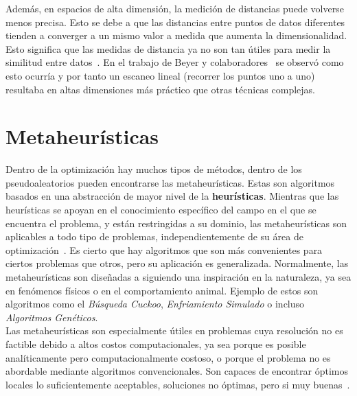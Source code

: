 Además, en espacios de alta dimensión, la medición de distancias puede volverse menos precisa. Esto se debe a que las distancias entre puntos de datos diferentes tienden a converger a un mismo valor a medida que aumenta la dimensionalidad. Esto significa que las medidas de distancia ya no son tan útiles para medir la similitud entre datos~\cite{peng_interpreting_2024, venkat2018curse}. En el trabajo de Beyer y colaboradores~\cite{beyer99nn} se observó como esto ocurría y por tanto un escaneo lineal (recorrer los puntos uno a uno) resultaba en altas dimensiones más práctico que otras técnicas complejas.
\section{Metaheurísticas}
Dentro de la optimización hay muchos tipos de métodos, dentro de los pseudoaleatorios pueden encontrarse las metaheurísticas. Estas son algoritmos basados en una abstracción de mayor nivel de la \textbf{heurísticas}. Mientras que las heurísticas se apoyan en el conocimiento específico del campo en el que se encuentra el problema, y están restringidas a su dominio, las metaheurísticas son aplicables a todo tipo de problemas, independientemente de su área de optimización~\cite{bianchi2009survey}. Es cierto que hay algoritmos que son más convenientes para ciertos problemas que otros, pero su aplicación es generalizada. Normalmente, las metaheurísticas son diseñadas a siguiendo una inspiración en la naturaleza, ya sea en fenómenos físicos o en el comportamiento animal. Ejemplo de estos son algoritmos como el \textit{Búsqueda Cuckoo}, \textit{Enfriamiento Simulado} o incluso \textit{Algoritmos Genéticos}.\\[6pt]
Las metaheurísticas son especialmente útiles en problemas cuya resolución no es factible debido a altos costos computacionales, ya sea porque es posible analíticamente pero computacionalmente costoso, o porque el problema no es abordable mediante algoritmos convencionales. Son capaces de encontrar óptimos locales lo suficientemente aceptables, soluciones no óptimas, pero si muy buenas~\cite{bianchi2009survey}.

